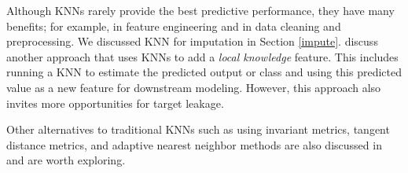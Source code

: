 \documentclass[]{krantz}
\begin{document}
Although KNNs rarely provide the best predictive performance, they have many benefits; for example, in feature engineering and in data cleaning and preprocessing. We discussed KNN for imputation in Section \ref{impute}. \citet{bruce2017practical} discuss another approach that uses KNNs to add a \emph{local knowledge} feature. This includes running a KNN to estimate the predicted output or class and using this predicted value as a new feature for downstream modeling. However, this approach also invites more opportunities for target leakage.

Other alternatives to traditional KNNs such as using invariant metrics, tangent distance metrics, and adaptive nearest neighbor methods are also discussed in \citet{esl} and are worth exploring.



\backmatter
\printindex
\end{document}

